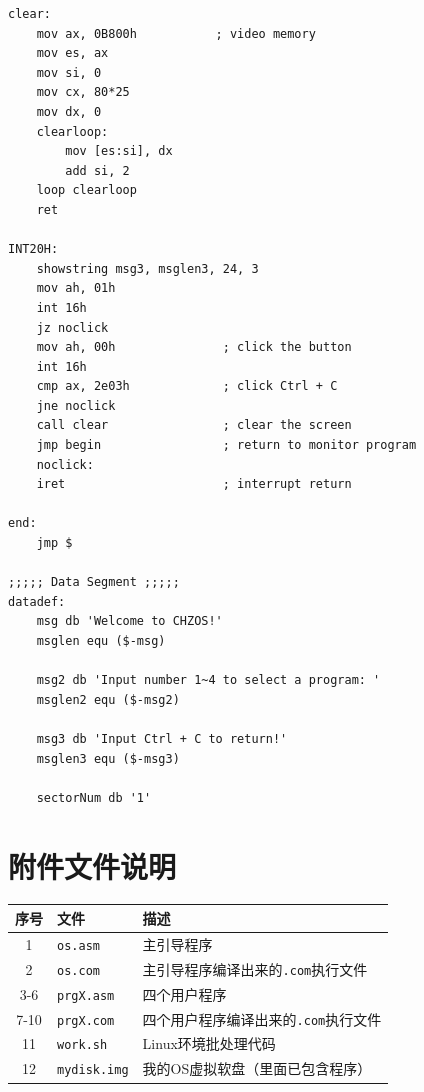 \documentclass[logo,reportComp]{thesis}
\begin{document}
\begin{lstlisting}[language={[x86masm]Assembler}]
clear:
    mov ax, 0B800h           ; video memory
    mov es, ax
    mov si, 0
    mov cx, 80*25
    mov dx, 0
    clearloop:
        mov [es:si], dx
        add si, 2
    loop clearloop
    ret

INT20H:
    showstring msg3, msglen3, 24, 3
    mov ah, 01h
    int 16h
    jz noclick
    mov ah, 00h               ; click the button
    int 16h
    cmp ax, 2e03h             ; click Ctrl + C
    jne noclick
    call clear                ; clear the screen
    jmp begin                 ; return to monitor program
    noclick:
    iret                      ; interrupt return

end:
    jmp $

;;;;; Data Segment ;;;;;
datadef:
    msg db 'Welcome to CHZOS!'
    msglen equ ($-msg)

    msg2 db 'Input number 1~4 to select a program: '
    msglen2 equ ($-msg2)

    msg3 db 'Input Ctrl + C to return!'
    msglen3 equ ($-msg3)

    sectorNum db '1'
\end{lstlisting}

\section{附件文件说明}
\begin{center}
\begin{tabular}{|c|l|l|}\hline
序号 & 文件 & 描述 \\\hline
1 & \verb'os.asm' & 主引导程序 \\\hline
2 & \verb'os.com' & 主引导程序编译出来的\verb'.com'执行文件\\\hline
3-6 & \verb'prgX.asm' & 四个用户程序\\\hline
7-10 & \verb'prgX.com' & 四个用户程序编译出来的\verb'.com'执行文件\\\hline
11 & \verb'work.sh' & Linux环境批处理代码\\\hline
12 & \verb'mydisk.img' & 我的OS虚拟软盘（里面已包含程序）\\\hline
\end{tabular}
\end{center}
\end{document}
